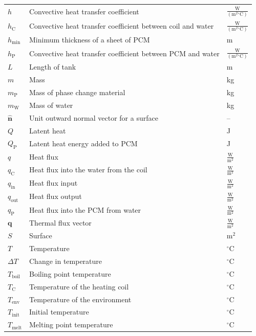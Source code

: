 \documentclass[12pt]{article}
\begin{document}
\begin{longtabu}{l X[l] l}
\\
$h$ & Convective heat transfer coefficient & $\frac{\text{W}}{(\text{m}^{2}{}^{\circ}\text{C})}$
\\
${h_{\text{C}}}$ & Convective heat transfer coefficient between coil and water & $\frac{\text{W}}{(\text{m}^{2}{}^{\circ}\text{C})}$
\\
${h_{\text{min}}}$ & Minimum thickness of a sheet of PCM & m
\\
${h_{\text{P}}}$ & Convective heat transfer coefficient between PCM and water & $\frac{\text{W}}{(\text{m}^{2}{}^{\circ}\text{C})}$
\\
$L$ & Length of tank & m
\\
$m$ & Mass & kg
\\
${m_{\text{P}}}$ & Mass of phase change material & kg
\\
${m_{\text{W}}}$ & Mass of water & kg
\\
$\mathbf{\hat{n}}$ & Unit outward normal vector for a surface & --
\\
$Q$ & Latent heat & J
\\
${Q_{\text{P}}}$ & Latent heat energy added to PCM & J
\\
$q$ & Heat flux & $\frac{\text{W}}{\text{m}^{2}}$
\\
${q_{\text{C}}}$ & Heat flux into the water from the coil & $\frac{\text{W}}{\text{m}^{2}}$
\\
${q_{\text{in}}}$ & Heat flux input & $\frac{\text{W}}{\text{m}^{2}}$
\\
${q_{\text{out}}}$ & Heat flux output & $\frac{\text{W}}{\text{m}^{2}}$
\\
${q_{\text{P}}}$ & Heat flux into the PCM from water & $\frac{\text{W}}{\text{m}^{2}}$
\\
$\mathbf{q}$ & Thermal flux vector & $\frac{\text{W}}{\text{m}^{2}}$
\\
$S$ & Surface & $\text{m}^{2}$
\\
$T$ & Temperature & ${}^{\circ}$C
\\
$ΔT$ & Change in temperature & ${}^{\circ}$C
\\
${T_{\text{boil}}}$ & Boiling point temperature & ${}^{\circ}$C
\\
${T_{\text{C}}}$ & Temperature of the heating coil & ${}^{\circ}$C
\\
${T_{\text{env}}}$ & Temperature of the environment & ${}^{\circ}$C
\\
${T_{\text{init}}}$ & Initial temperature & ${}^{\circ}$C
\\
${T_{\text{melt}}}$ & Melting point temperature & ${}^{\circ}$C

\end{longtabu}
\end{document}
